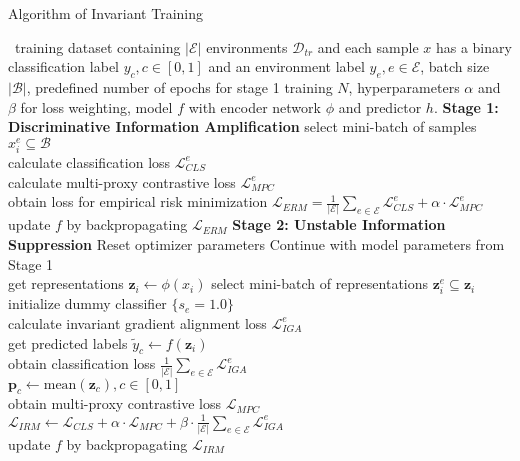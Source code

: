 \begin{algorithm}[htb]
\caption{Algorithm of Invariant Training}
\label{alg1}
    \begin{algorithmic}[1]
    \REQUIRE ~training dataset containing $|\mathcal{E}|$ environments $\mathcal{D}_{tr}$ and each sample $x$ has a binary classification label $y_{c}, c \in [0, 1]$ and an environment label $y_e, e \in \mathcal{E}$, batch size $|\mathcal{B}|$, predefined number of epochs for stage 1 training $N$, hyperparameters $\alpha$ and $\beta$ for loss weighting, model $f$ with encoder network $\phi$ and predictor $h$. 
    \ENSURE 
    \STATE \textbf{Stage 1: Discriminative Information Amplification}
            \STATE select mini-batch of samples ${x_i^{e}} \subseteq \mathcal{B}$ \\
            \STATE calculate classification loss $\mathcal{L}^{e}_{CLS}$\\
            \STATE calculate multi-proxy contrastive loss $\mathcal{L}^{e}_{MPC}$ \\
            \ENDFOR
        \STATE obtain loss for empirical risk minimization $\mathcal{L}_{ERM} = \frac{1}{|\mathcal{E}|} \sum_{e \in \mathcal{E}} \mathcal{L}^{e}_{CLS} + \alpha \cdot \mathcal{L}^{e}_{MPC}$
        \STATE update $f$ by backpropagating $\mathcal{L}_{ERM}$
        \ENDFOR
    \ENDFOR
    \STATE \textbf{Stage 2: Unstable Information Suppression}
    \STATE Reset optimizer parameters
    \STATE Continue with model parameters from Stage 1\\
            \STATE get representations $\mathbf{z}_i \gets \phi(x_i)$
            \STATE select mini-batch of representations ${\mathbf{z}_i^{e}} \subseteq \mathbf{z}_i$ \\
            \STATE initialize dummy classifier $\{s_{e} = 1.0\}$ \\
            \STATE calculate invariant gradient alignment loss $\mathcal{L}^e_{IGA}$ \\
            \ENDFOR
            \STATE get predicted labels $\tilde{y}_c \gets f(\mathbf{z}_i)$ \\
            \STATE obtain classification loss $\frac{1}{|\mathcal{E}|}\sum_{e \in \mathcal{E}}\mathcal{L}^e_{IGA}$ \\
            \STATE $\mathbf{p}_{c} \gets \text{mean}(\mathbf{z}_c),c \in [0, 1]$ \\
            \STATE obtain multi-proxy contrastive loss $\mathcal{L}_{MPC}$ \\
            \STATE $\mathcal{L}_{IRM} \gets \mathcal{L}_{CLS} + \alpha \cdot \mathcal{L}_{MPC} + \beta \cdot \frac{1}{|\mathcal{E}|}\sum_{e \in \mathcal{E}}\mathcal{L}^e_{IGA}$ \\
            \STATE update $f$ by backpropagating $\mathcal{L}_{IRM}$
        \ENDFOR
    \ENDFOR
    \end{algorithmic}
\end{algorithm}